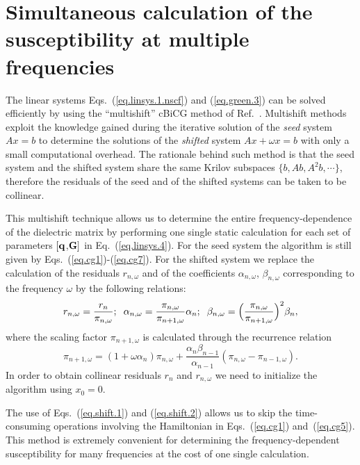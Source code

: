 \documentclass[twocolumn,prb,showpacs,superscriptaddress]{revtex4}
\def\w{\omega}
\def\q{{\bf q}}
\def\G{{\bf G}}
\begin{document}
\section{Simultaneous calculation of the susceptibility at multiple frequencies}\label{app.multishift}

The linear systems Eqs.\ (\ref{eq.linsys.1.nscf}) and (\ref{eq.green.3})
can be solved efficiently by using the ``multishift'' 
cBiCG method of Ref.~.
Multishift methods exploit the knowledge gained during the iterative
solution of the {\it seed} system $Ax=b$ to determine the solutions 
of the {\it shifted} system $Ax+\w x=b$ with only a small computational overhead.
The rationale behind such method is that the seed system and the
shifted system share the same Krilov subspaces $\{b,Ab,A^2b,\cdots\}$,
therefore the residuals of the seed and of the shifted
systems can be taken to be collinear.\cite{frommer}

This multishift technique allows us to determine the
entire frequency-dependence of the dielectric matrix
by performing one single static calculation for each set of parameters $[\q$,$\G]$ in
Eq.\ (\ref{eq.linsys.4}).
For the seed system the algorithm is still given by Eqs.\ (\ref{eq.cg1})-(\ref{eq.cg7}).
For the shifted system we replace the calculation of the residuals
$r_{n,\w}$ and of the coefficients $\alpha_{n,\w}$, $\beta_{n,\w}$ corresponding
to the frequency $\w$ by the following relations:
  \begin{equation} \label{eq.shift.1}
  r_{n,\w}  =\frac{r_n}{\pi_{n,\w}};
  \hspace{0.2cm}
  \alpha_{n,\w}  =  \frac{\pi_{n,\w}}{\pi_{n+1,\w}}\alpha_n ;
  \hspace{0.2cm}
  \beta_{n,\w}  =  \Big(\frac{\pi_{n,\w}}{\pi_{n+1,\w}}\Big)^2\beta_n,
  \end{equation}
where the scaling factor $\pi_{n+1,\w}$ is calculated through the recurrence relation
  \begin{equation}\label{eq.shift.2}
  \pi_{n+1,\w} = (1+\w\alpha_n) \pi_{n,\w} + \frac{\alpha_n\beta_{n-1}}{\alpha_{n-1}}(\pi_{n,\w}-\pi_{n-1,\w}).
  \end{equation}
In order to obtain collinear residuals $r_n$ and $r_{n,\w}$ we need to
initialize the algorithm using $x_0=0$.

The use of Eqs.~(\ref{eq.shift.1}) and (\ref{eq.shift.2}) allows us to
skip the time-consuming operations involving the Hamiltonian in
Eqs.\ (\ref{eq.cg1}) and~(\ref{eq.cg5}).
This method is extremely convenient for determining the frequency-dependent
susceptibility for many frequencies at the cost of one single calculation.
\end{document}
